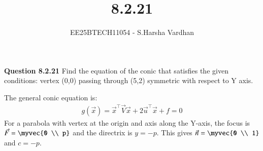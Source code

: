 \documentclass[journal]{IEEEtran}
\begin{document}


\title{8.2.21}
\author{EE25BTECH11054 - S.Harsha Vardhan}
\maketitle 
\renewcommand{\thefigure}{\theenumi}
\renewcommand{\thetable}{\theenumi}
\setlength{\intextsep}{10pt} %

\renewcommand{\thetable}{\theenumi}
\vspace{-1em}
\textbf{Question 8.2.21}
Find the equation of the conic that satisfies the given conditions:
vertex (0,0) passing through (5,2) symmetric with respect to Y axis.

\solution
The general conic equation is:
\begin{align}
 g(\vec{x}) = \vec{x}^\top \vec{V}\vec{x} + 2\vec{u}^\top \vec{x} + f = 0 \tag{1}
\end{align}
For a parabola with vertex at the origin and axis along the Y-axis, the focus is $\vec{F} = \myvec{0 \\ p}$ and the directrix is $y = -p$. This gives $\vec{n} = \myvec{0 \\ 1}$ and $c = -p$.
\end{document}
